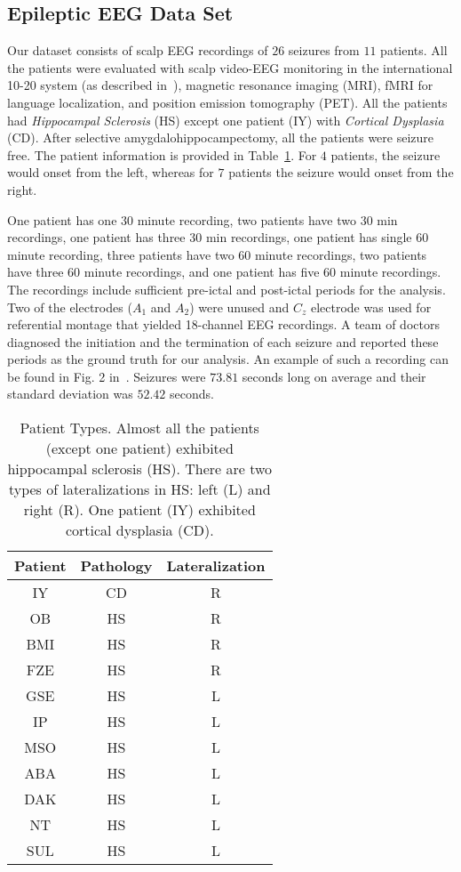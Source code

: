 \documentclass{article} %
\begin{document}
\subsection{Epileptic EEG Data Set} \label{sec:eeg_data}
Our dataset consists of scalp EEG recordings of $26$ seizures from $11$ patients.  All the patients were evaluated with scalp video-EEG monitoring in the international 10-20 system (as described in~\cite{jasper_1020}), magnetic resonance imaging (MRI), fMRI for language localization, and position emission tomography (PET).  All the patients had {\em Hippocampal Sclerosis} (HS) except one patient (IY) with {\em Cortical Dysplasia} (CD). After selective amygdalohippocampectomy, all the patients were seizure free.  The patient information is provided in Table~\ref{tab:patient_types}.  For $4$ patients, the seizure would onset from the left, whereas for $7$ patients the seizure would onset from the right. 

One patient has one $30$ minute recording, two patients have two $30$ min recordings, one patient has three $30$ min recordings, one 
patient has single $60$ minute recording, three patients have two $60$ minute recordings, two patients have three $60$ minute recordings, and one patient has five $60$ minute recordings.  The recordings include sufficient \mbox{pre-ictal} and \mbox{post-ictal} periods for the  analysis. Two of the electrodes ($A_1$  and $A_2$) were unused and  $C_z$ electrode was used for referential montage that yielded \mbox{18-channel} EEG
recordings.  A team of doctors diagnosed the initiation and the termination of each seizure and reported these periods as the ground truth for our
analysis.  An example of such a recording can be found in Fig. 2 in~\cite{smith_eegrecording}.  Seizures were $73.81$ seconds long on average and their standard deviation was $52.42$ seconds.

\begin{table}[htdp]
\caption{Patient Types. Almost all the patients (except one patient) exhibited hippocampal sclerosis (HS).  
There are two types of lateralizations in HS: left (L) and right (R).  One patient (IY) 
exhibited cortical dysplasia (CD).}
\renewcommand{\arraystretch}{0.9}
\begin{center}
\begin{tabular}{ccc}
	Patient & Pathology & Lateralization\\
	\hline
	IY&CD&R\\
	OB&HS&R\\
	BMI&HS&R\\
	FZE&HS&R\\
	GSE&HS&L\\
	IP&HS&L\\
	MSO	&HS&L\\	
	ABA&HS&L\\
	DAK&HS&L\\
	NT&HS&L\\
	SUL&HS&L\\
\end{tabular}
\end{center}
\label{tab:patient_types}
\end{table}
\end{document}
